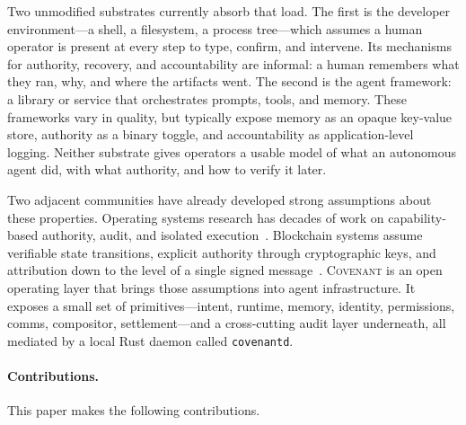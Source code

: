 \documentclass[11pt]{article}
\theoremstyle{plainsmall}
\begin{document}
Two unmodified substrates currently absorb that load. The first is the developer environment---a shell, a filesystem, a process tree---which assumes a human operator is present at every step to type, confirm, and intervene. Its mechanisms for authority, recovery, and accountability are informal: a human remembers what they ran, why, and where the artifacts went. The second is the agent framework: a library or service that orchestrates prompts, tools, and memory. These frameworks vary in quality, but typically expose memory as an opaque key-value store, authority as a binary toggle, and accountability as application-level logging. Neither substrate gives operators a usable model of what an autonomous agent did, with what authority, and how to verify it later.

Two adjacent communities have already developed strong assumptions about these properties. Operating systems research has decades of work on capability-based authority, audit, and isolated execution~\cite{dennis1966,miller2006,sel4}. Blockchain systems assume verifiable state transitions, explicit authority through cryptographic keys, and attribution down to the level of a single signed message~\cite{nakamoto2008,yakovenko2018}. \textsc{Covenant} is an open operating layer that brings those assumptions into agent infrastructure. It exposes a small set of primitives---intent, runtime, memory, identity, permissions, comms, compositor, settlement---and a cross-cutting audit layer underneath, all mediated by a local Rust daemon called \texttt{covenantd}.

\paragraph{Contributions.} This paper makes the following contributions.
\end{document}
